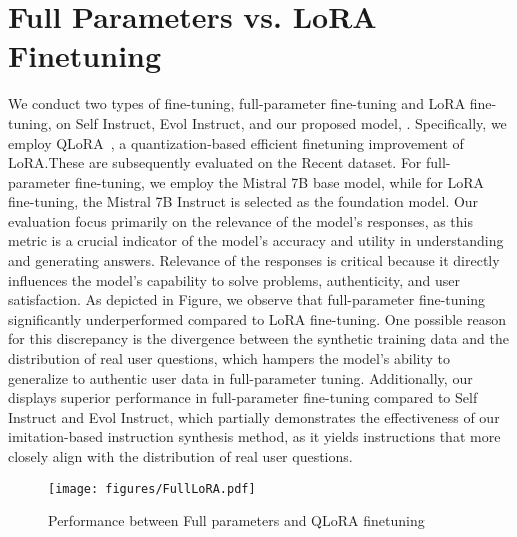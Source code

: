 \section{Full Parameters vs. LoRA Finetuning}
We conduct two types of fine-tuning, full-parameter fine-tuning and LoRA fine-tuning, on Self Instruct, Evol Instruct, and our proposed model, \ourmodel. Specifically, we employ QLoRA~\cite{dettmers2024qlora}, a quantization-based efficient finetuning improvement of LoRA.These are subsequently evaluated on the Recent dataset. For full-parameter fine-tuning, we employ the Mistral 7B base model, while for LoRA fine-tuning, the Mistral 7B Instruct is selected as the foundation model. Our evaluation focus primarily on the relevance of the model's responses, as this metric is a crucial indicator of the model's accuracy and utility in understanding and generating answers. Relevance of the responses is critical because it directly influences the model’s capability to solve problems, authenticity, and user satisfaction. As depicted in Figure, we observe that full-parameter fine-tuning significantly underperformed compared to LoRA fine-tuning. One possible reason for this discrepancy is the divergence between the synthetic training data and the distribution of real user questions, which hampers the model's ability to generalize to authentic user data in full-parameter tuning. Additionally, our \ourmodel displays superior performance in full-parameter fine-tuning compared to Self Instruct and Evol Instruct, which partially demonstrates the effectiveness of our imitation-based instruction synthesis method, as it yields instructions that more closely align with the distribution of real user questions.

\begin{figure}[htbp]
\centering
\texttt{[image: figures/FullLoRA.pdf]}
    \caption{Performance between Full parameters and QLoRA finetuning}
    \label{fig:fullandlora}
\end{figure}



